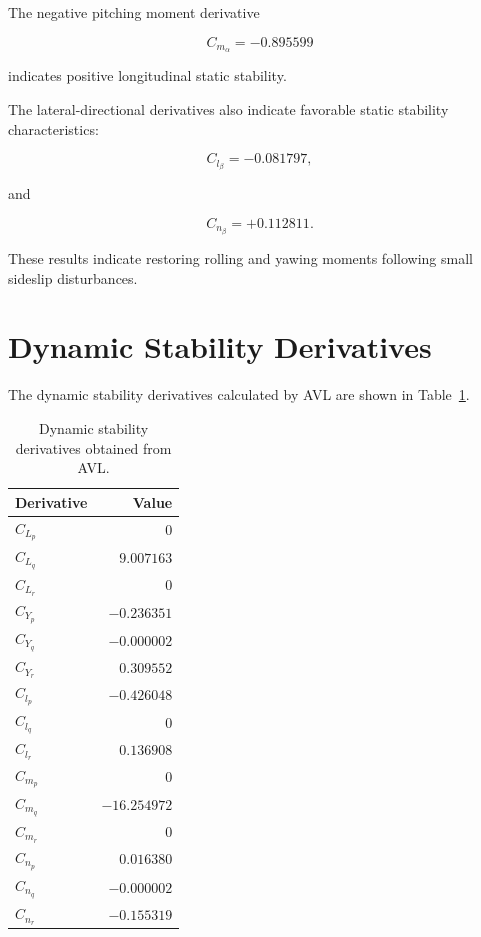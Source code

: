 \documentclass[11pt,a4paper]{article}
\begin{document}
The negative pitching moment derivative

\begin{equation}
C_{m_\alpha}=-0.895599
\end{equation}

indicates positive longitudinal static stability.

The lateral-directional derivatives also indicate favorable static
stability characteristics:

\begin{equation}
C_{l_\beta}=-0.081797,
\end{equation}

and

\begin{equation}
C_{n_\beta}=+0.112811.
\end{equation}

These results indicate restoring rolling and yawing moments following
small sideslip disturbances.

\section{Dynamic Stability Derivatives}

The dynamic stability derivatives calculated by AVL are shown in
Table~\ref{tab:dynamic_derivatives}.

\begin{table}[H]
\centering
\caption{Dynamic stability derivatives obtained from AVL.}
\label{tab:dynamic_derivatives}
\begin{tabular}{lr}
\toprule
Derivative & Value \\
\midrule
$C_{L_p}$ & $0$ \\
$C_{L_q}$ & $9.007163$ \\
$C_{L_r}$ & $0$ \\
$C_{Y_p}$ & $-0.236351$ \\
$C_{Y_q}$ & $-0.000002$ \\
$C_{Y_r}$ & $0.309552$ \\
$C_{l_p}$ & $-0.426048$ \\
$C_{l_q}$ & $0$ \\
$C_{l_r}$ & $0.136908$ \\
$C_{m_p}$ & $0$ \\
$C_{m_q}$ & $-16.254972$ \\
$C_{m_r}$ & $0$ \\
$C_{n_p}$ & $0.016380$ \\
$C_{n_q}$ & $-0.000002$ \\
$C_{n_r}$ & $-0.155319$ \\
\bottomrule
\end{tabular}
\end{table}
\end{document}
